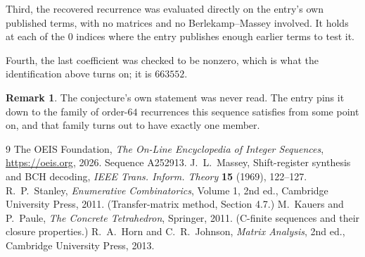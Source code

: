 \documentclass[11pt,a4paper]{article}
\theoremstyle{plain}
\theoremstyle{definition}
\newtheorem{remark}[theorem]{Remark}
\begin{document}
Third, the recovered recurrence was evaluated directly on the entry's own published terms, with
no matrices and no Berlekamp--Massey involved. It holds at each of the $0$ indices where
the entry publishes enough earlier terms to test it.

Fourth, the last coefficient was checked to be nonzero, which is what the identification above
turns on; it is $663552$.

\begin{remark}
The conjecture's own statement was never read. The entry pins it down to the family of
order-$64$ recurrences this sequence satisfies from some point on, and that family turns
out to have exactly one member.
\end{remark}

\begin{thebibliography}{9}
 The OEIS Foundation, \emph{The On-Line Encyclopedia of Integer
Sequences}, \url{https://oeis.org}, 2026. Sequence A252913.
 J.~L.~Massey, Shift-register synthesis and BCH decoding, \emph{IEEE
Trans. Inform. Theory} \textbf{15} (1969), 122--127.
 R.~P.~Stanley, \emph{Enumerative Combinatorics}, Volume 1, 2nd ed.,
Cambridge University Press, 2011. (Transfer-matrix method, Section 4.7.)
 M.~Kauers and P.~Paule, \emph{The Concrete Tetrahedron}, Springer, 2011.
(C-finite sequences and their closure properties.)
 R.~A.~Horn and C.~R.~Johnson, \emph{Matrix Analysis}, 2nd ed., Cambridge
University Press, 2013.
\end{thebibliography}
\end{document}
